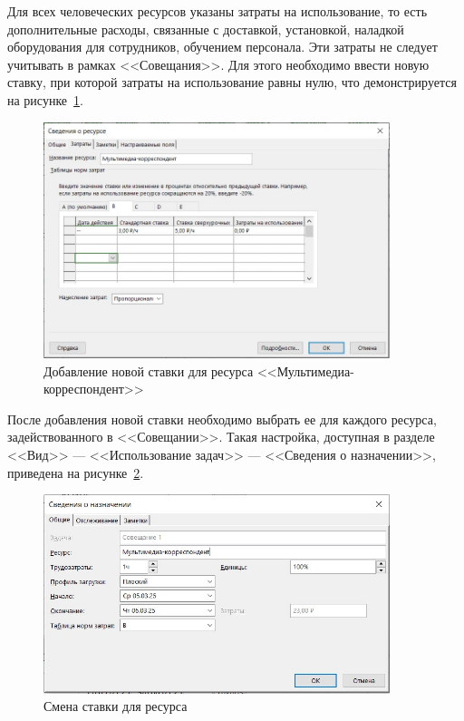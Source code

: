 Для всех человеческих ресурсов указаны затраты на использование, то есть дополнительные расходы, связанные с доставкой, установкой, наладкой оборудования для сотрудников, обучением персонала.
Эти затраты не следует учитывать в рамках <<Совещания>>.
Для этого необходимо ввести новую ставку, при которой затраты на использование равны нулю, что демонстрируется на рисунке~\ref{fig:screen2_3}.

\begin{figure}[H]
	\centering
	\includegraphics[width=0.9\textwidth]{img/lab3/task2/screen3.jpg}
	\caption{Добавление новой ставки для ресурса <<Мультимедиа-корреспондент>>}
	\label{fig:screen2_3}
\end{figure}

После добавления новой ставки необходимо выбрать ее для каждого ресурса, задействованного в <<Совещании>>.
Такая настройка, доступная в разделе <<Вид>> --- <<Использование задач>> --- <<Сведения о назначении>>, приведена на рисунке~\ref{fig:screen2_4}.

\begin{figure}[H]
	\centering
	\includegraphics[width=0.9\textwidth]{img/lab3/task2/screen4.jpg}
	\caption{Смена ставки для ресурса}
	\label{fig:screen2_4}
\end{figure}

